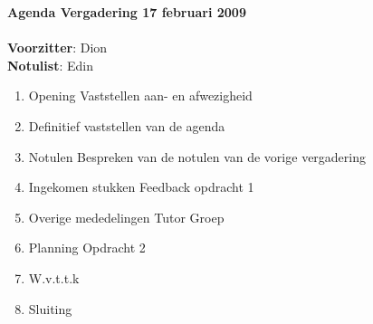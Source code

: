 \documentclass[11pt,oneside,a4paper]{article}
\begin{document}
\textbf{{\LARGE{Agenda Vergadering 17 februari 2009}}}\\ \\
\textbf{Voorzitter}: Dion\\
\textbf{Notulist}: Edin\\
\begin{enumerate}
    \item Opening
        \subitem Vaststellen aan- en afwezigheid
    \item Definitief vaststellen van de agenda
    \item Notulen
        \subitem Bespreken van de notulen van de vorige vergadering
    \item Ingekomen stukken
        \subitem Feedback opdracht 1
    \item Overige mededelingen
        \subitem Tutor
        \subitem Groep
    \item Planning
            \subitem Opdracht 2
    \item W.v.t.t.k
    \item Sluiting
\end{enumerate}
\end{document}
